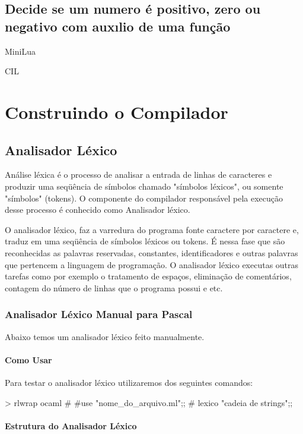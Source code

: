 \documentclass[12pt,a4paper]{report}
\begin{document}
\section{Decide se um numero é positivo, zero ou negativo com auxılio de uma função}
MiniLua

CIL



\chapter{Construindo o Compilador}

\section{Analisador Léxico}
Análise léxica é o processo de analisar a entrada de linhas de caracteres e produzir uma seqüência de símbolos chamado "símbolos léxicos", ou somente "símbolos" (tokens). O componente do compilador responsável pela execução desse processo é conhecido como Analisador léxico.

O analisador léxico, faz a varredura do programa fonte caractere por caractere e, traduz em uma seqüência de símbolos léxicos ou tokens. É nessa fase que são reconhecidas as palavras reservadas, constantes, identificadores e outras palavras que pertencem a linguagem de programação. O analisador léxico executas outras tarefas como por exemplo o tratamento de espaços, eliminação de comentários, contagem do número de linhas que o programa possui e etc.

\subsection{Analisador Léxico Manual para Pascal}
Abaixo temos um analisador léxico feito manualmente.


\subsubsection{Como Usar}

Para testar o analisador léxico utilizaremos dos seguintes comandos:
\begin{terminal}
> rlwrap ocaml
# #use "nome_do_arquivo.ml";;
# lexico "cadeia de strings";;
\end{terminal}

\subsubsection{Estrutura do Analisador Léxico}
\end{document}
